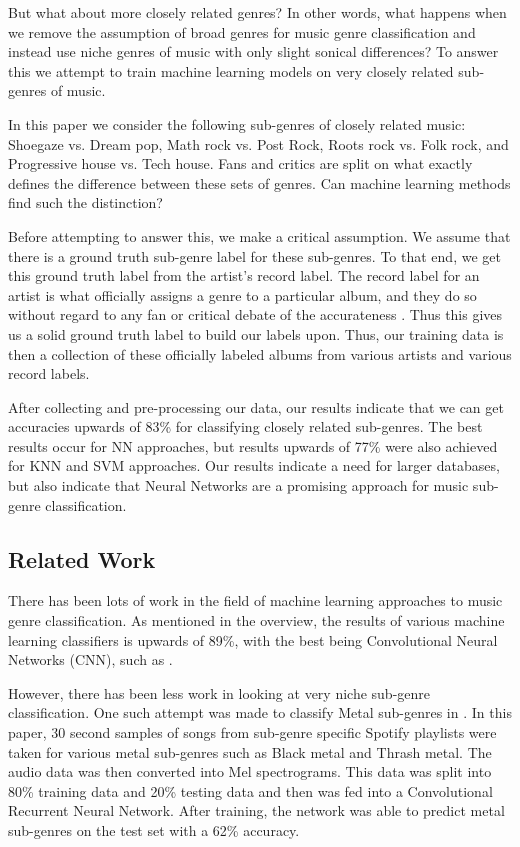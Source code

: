 \documentclass[letterpaper, 12 pt, conference]{ieeeconf}  %
\begin{document}
But what about more closely related genres? In other words, what happens when we remove the assumption of broad genres for music genre classification and instead use niche genres of music with only slight sonical differences?  To answer this we attempt to train machine learning models on very closely related sub-genres of music. 

In this paper we consider the following sub-genres of closely related music: Shoegaze vs. Dream pop, Math rock vs. Post Rock, Roots rock vs. Folk rock, and Progressive house vs. Tech house. Fans and critics are split on what exactly defines the difference between these sets of genres. Can machine learning methods find such the distinction? 

Before attempting to answer this, we make a critical assumption. We assume that there is a ground truth sub-genre label for these sub-genres. To that end, we get this ground truth label from the artist's record label. The record label for an artist is what officially assigns a genre to a particular album, and they do so without regard to any fan or critical debate of the accurateness \cite{c8}. Thus this gives us a solid ground truth label to build our labels upon. Thus, our training data is then a collection of these officially labeled albums from various artists and various record labels.

After collecting and pre-processing our data, our results indicate that we can get accuracies upwards of 83\%  for classifying closely related sub-genres. The best results occur for NN approaches, but results upwards of 77\% were also achieved for KNN and SVM approaches. Our results indicate a need for larger databases, but also indicate that Neural Networks are a promising approach for music sub-genre classification. 




\subsection{Related Work}


There has been lots of work in the field of machine learning approaches to music genre classification. As mentioned in the overview, the results of various machine learning classifiers is upwards of 89\%, with the best being Convolutional Neural Networks (CNN),  such as \cite{c4}. 

However, there has been less work in looking at very niche sub-genre classification. One such attempt was made to classify Metal sub-genres in \cite{c5}. In this paper, 30 second samples of songs from sub-genre specific Spotify playlists were taken for various metal sub-genres such as Black metal and Thrash metal. The audio data was then converted into Mel spectrograms. This data was split into 80\% training data and 20\% testing data and then was fed into a Convolutional Recurrent Neural Network. After training, the network was able to predict metal sub-genres on the test set with a 62\% accuracy. 
\end{document}
